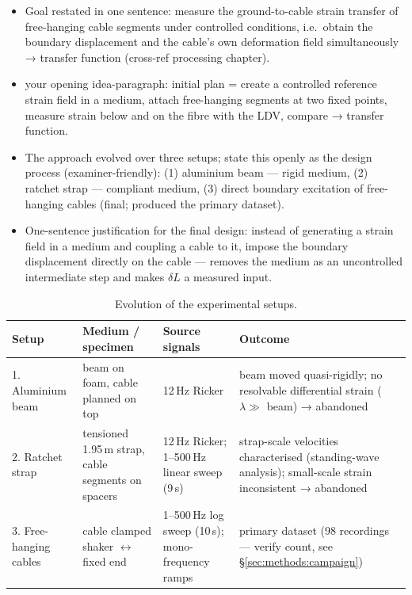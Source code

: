 \begin{itemize}
  \item Goal restated in one sentence: measure the ground-to-cable strain
    transfer of free-hanging cable segments under controlled conditions,
    i.e.\ obtain the boundary displacement and the cable's own deformation
    field simultaneously → transfer function (cross-ref processing chapter).
  \item [KEEP] your opening idea-paragraph: initial plan = create a
    controlled reference strain field in a medium, attach free-hanging
    segments at two fixed points, measure strain below and on the fibre with
    the LDV, compare → transfer function.
  \item The approach evolved over three setups; state this openly as the
    design process (examiner-friendly): (1) aluminium beam — rigid medium,
    (2) ratchet strap — compliant medium, (3) direct boundary excitation of
    free-hanging cables (final; produced the primary dataset).
  \item One-sentence justification for the final design: instead of
    generating a strain field in a medium and coupling a cable to it, impose
    the boundary displacement directly on the cable — removes the medium as
    an uncontrolled intermediate step and makes $\delta L$ a measured input.
\end{itemize}

\begin{table}[H]
  \centering
  \begin{tabularx}{\textwidth}{l l l X}
    \toprule
    \textbf{Setup} & \textbf{Medium / specimen} & \textbf{Source signals} &
    \textbf{Outcome} \\
    \midrule
    1. Aluminium beam & beam on foam, cable planned on top &
      12\,Hz Ricker &
      beam moved quasi-rigidly; no resolvable differential strain
      ($\lambda \gg$ beam) → abandoned \\
    2. Ratchet strap & tensioned 1.95\,m strap, cable segments on spacers &
      12\,Hz Ricker; 1–500\,Hz linear sweep (9\,s) &
      strap-scale velocities characterised (standing-wave analysis);
      small-scale strain inconsistent → abandoned \\
    3. Free-hanging cables & cable clamped shaker $\leftrightarrow$ fixed end &
      1–500\,Hz log sweep (10\,s); mono-frequency ramps &
      primary dataset (98 recordings — verify count, see
      §\ref{sec:methods:campaign}) \\
    \bottomrule
  \end{tabularx}
  \caption[Evolution of the experimental setups]{Evolution of the
    experimental setups. %
  }
  \label{tab:methods:evolution}
\end{table}

